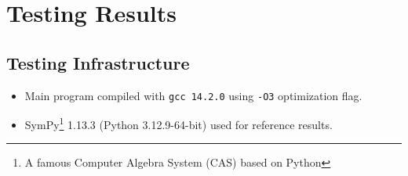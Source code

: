 \documentclass{report}
\begin{document}
\newpage
\chapter{Testing Results}
\section*{Testing Infrastructure}
\begin{itemize}
    \item Main program compiled with \texttt{gcc 14.2.0} using \texttt{-O3} optimization flag.
    \item SymPy\footnote{A famous Computer Algebra System (CAS) based on Python} 1.13.3 (Python 3.12.9-64-bit) used for reference results.
\end{itemize}
\end{document}
